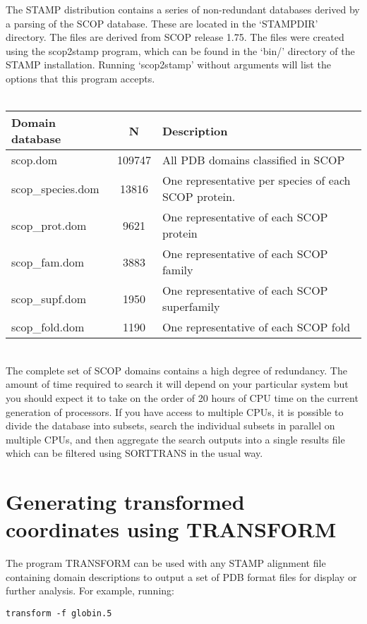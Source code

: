 The STAMP distribution
contains a series of non-redundant databases derived by a parsing of the
SCOP database.  These are located in the `STAMPDIR' directory. The files are
derived from SCOP release 1.75. The files were created using the scop2stamp
program, which can be found in the `bin/' directory of the STAMP installation.
Running `scop2stamp' without arguments will list the options that this program accepts.\\
\\
\begin{tabular}{lcl}
    Domain database         & N & Description\\
    \hline
    scop.dom		& 109747 & All PDB domains classified in SCOP\\
    scop\_species.dom	& 13816  & One representative per species of each SCOP protein.\\
    scop\_prot.dom		& 9621  & One representative of each SCOP protein \\
    scop\_fam.dom		& 3883  & One representative of each SCOP family\\
    scop\_supf.dom		&  1950  & One representative of each SCOP superfamily\\
    scop\_fold.dom		&  1190  & One representative of each SCOP fold\\
\end{tabular}
\\
The complete set of SCOP domains contains a high degree of redundancy. The amount
of time required to search it will depend on your particular system but you should
expect it to take on the order of 20 hours of CPU time on the current generation
of processors. If you have access to multiple CPUs, it is possible to divide
the database into subsets, search the individual subsets in parallel on multiple
CPUs, and then aggregate the search outputs into a single results file which
can be filtered using SORTTRANS in the usual way.

\section{Generating transformed coordinates using TRANSFORM}

The program TRANSFORM can be used with any STAMP alignment file containing domain
descriptions to output a set of PDB format files for display or
further analysis.  For example, running:\\

\begin{scriptsize}\begin{verbatim}
transform -f globin.5
\end{verbatim} \end{scriptsize}

